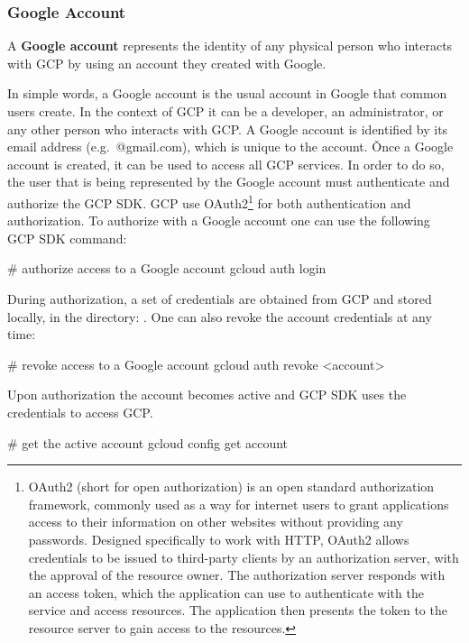 \subsubsection{Google Account}

A \textbf{Google account} represents the identity of any physical person who interacts with GCP by using an account
they created with Google.
\ed

In simple words, a Google account is the usual account in Google that common users create. In the context of GCP it can
be a developer, an administrator, or any other person who interacts with GCP\@. A Google account is identified by its
email address (e.g.\ @gmail.com), which is unique to the account. \v

Once a Google account is created, it can be used to access all GCP services. In order to do so, the user that is being
represented by the Google account must authenticate and authorize the GCP SDK. GCP use OAuth2\footnote{OAuth2 (short
for open authorization) is an open standard authorization framework, commonly used as a way for internet users to grant
applications access to their information on other websites without providing any passwords. Designed specifically to
work with HTTP, OAuth2 allows credentials to be issued to third-party clients by an authorization server, with the
approval of the resource owner. The authorization server responds with an access token, which the application can use
to authenticate with the service and access resources. The application then presents the token to the resource server
to gain access to the resources.} for both authentication and authorization. To authorize with a Google account one can
use the following GCP SDK command:
\begin{bash}
# authorize access to a Google account
gcloud auth login
\end{bash}

During authorization, a set of credentials are obtained from GCP and stored locally, in the directory:
. One can also revoke the account credentials at any time:
\begin{bash}
# revoke access to a Google account
gcloud auth revoke <account>
\end{bash}

Upon authorization the account becomes active and GCP SDK uses the credentials to access GCP\@.
\begin{bash}
# get the active account
gcloud config get account
\end{bash}

